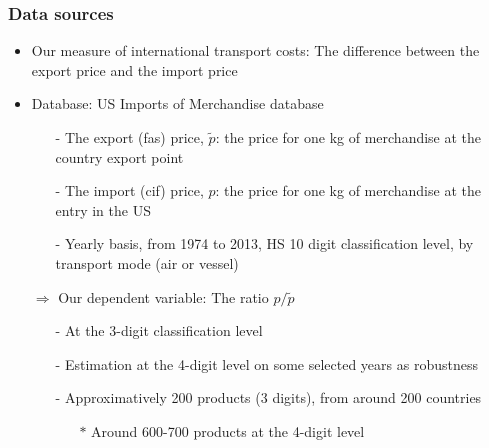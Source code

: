\documentclass[10 pt,Helvetica, french]{beamer}
\begin{document}
\begin{frame} [label=slide_data]
\frametitle{Data sources}
\begin{itemize}
\item Our measure of international transport costs: The difference between the export price and the import price \vspace{0.1cm}
\item Database: US Imports of Merchandise database \vspace{0.1cm}
\begin{itemize}
\item[-] The export (fas) price, $\widetilde{p}$: the price for one kg of merchandise at the country export point \vspace{0.1cm}
\item[-] The import (cif) price, $p$: the price for one kg of merchandise at the entry in the US \vspace{0.1cm}
\item[-] Yearly basis, from 1974 to 2013, HS 10 digit classification level, by transport mode (air or vessel) \vspace{0.1cm}
\end{itemize}
\item[$\Rightarrow$] Our dependent variable: The ratio $p/\widetilde{p}$ \vspace{0.1cm}
\begin{itemize}
\item[-] At the 3-digit classification level  \vspace{0.1cm}
\item[-] Estimation at the 4-digit level on some selected years as robustness \vspace{0.1cm}
\item[-] Approximatively 200 products (3 digits), from around 200 countries  \vspace{0.1cm}
\begin{itemize}
\item[$\ast$] Around 600-700 products at the 4-digit level
\end{itemize}
\end{itemize}
\end{itemize}
\end{frame}
\end{document}
